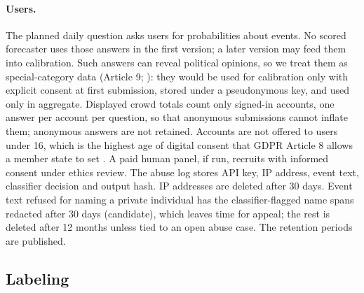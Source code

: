 \documentclass[11pt]{article}
\begin{document}
\paragraph{Users.} The planned daily question asks users for probabilities about events. No scored forecaster uses those answers in the first version; a later version may feed them into calibration. Such answers can reveal political opinions, so we treat them as special-category data (Article 9; \citealp{gdpr2016}): they would be used for calibration only with explicit consent at first submission, stored under a pseudonymous key, and used only in aggregate. Displayed crowd totals count only signed-in accounts, one answer per account per question, so that anonymous submissions cannot inflate them; anonymous answers are not retained. Accounts are not offered to users under 16, which is the highest age of digital consent that GDPR Article 8 allows a member state to set \citep{gdpr2016}. A paid human panel, if run, recruits with informed consent under ethics review. The abuse log stores API key, IP address, event text, classifier decision and output hash. IP addresses are deleted after 30 days. Event text refused for naming a private individual has the classifier-flagged name spans redacted after 30 days (candidate), which leaves time for appeal; the rest is deleted after 12 months unless tied to an open abuse case. The retention periods are published.

\subsection{Labeling}
\end{document}
